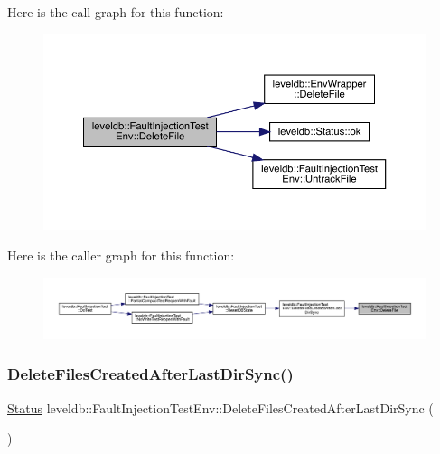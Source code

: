 Here is the call graph for this function\+:
\nopagebreak
\begin{figure}[H]
\begin{center}
\leavevmode
\includegraphics[width=350pt]{classleveldb_1_1_fault_injection_test_env_a3da37455396b1b0cd66689bf5302ebd9_cgraph}
\end{center}
\end{figure}
Here is the caller graph for this function\+:
\nopagebreak
\begin{figure}[H]
\begin{center}
\leavevmode
\includegraphics[width=350pt]{classleveldb_1_1_fault_injection_test_env_a3da37455396b1b0cd66689bf5302ebd9_icgraph}
\end{center}
\end{figure}
\mbox{\label{classleveldb_1_1_fault_injection_test_env_a0356c344573232057e7afcd738079805}} 
\subsubsection{\texorpdfstring{DeleteFilesCreatedAfterLastDirSync()}{DeleteFilesCreatedAfterLastDirSync()}}
{\footnotesize\ttfamily \mbox{\hyperlink{classleveldb_1_1_status}{Status}} leveldb\+::\+Fault\+Injection\+Test\+Env\+::\+Delete\+Files\+Created\+After\+Last\+Dir\+Sync (\begin{DoxyParamCaption}{ }\end{DoxyParamCaption})}

